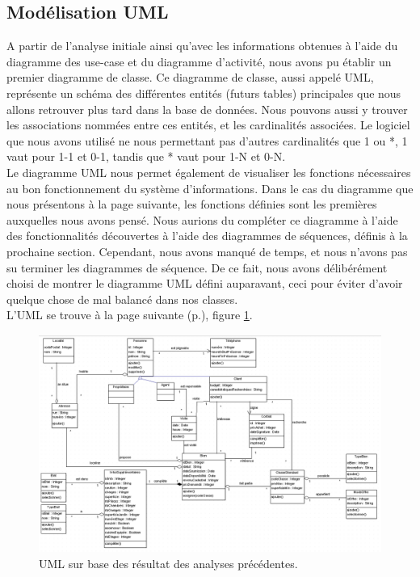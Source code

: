 \mbox{}
\subsection{Modélisation UML}
A partir de l'analyse initiale ainsi qu'avec les informations obtenues à l'aide du diagramme des use-case et du diagramme d'activité, nous avons pu établir un premier diagramme de classe. Ce diagramme de classe, aussi appelé UML, représente un schéma des différentes entités (futurs tables) principales que nous allons retrouver plus tard dans la base de données. Nous pouvons aussi y trouver les associations nommées entre ces entités, et les cardinalités associées. Le logiciel que nous avons utilisé ne nous permettant pas d'autres cardinalités que 1 ou *, 1 vaut pour 1-1 et 0-1, tandis que * vaut pour 1-N et 0-N.\\

Le diagramme UML nous permet également de visualiser les fonctions nécessaires au bon fonctionnement du système d'informations. Dans le cas du diagramme que nous présentons à la page suivante, les fonctions définies sont les premières auxquelles nous avons pensé. Nous aurions du compléter ce diagramme à l'aide des fonctionnalités découvertes à l'aide des diagrammes de séquences, définis à la prochaine section. Cependant, nous avons manqué de temps, et nous n'avons pas su terminer les diagrammes de séquence. De ce fait, nous avons délibérément choisi de montrer le diagramme UML défini auparavant, ceci pour éviter d'avoir quelque chose de mal balancé dans nos classes.\\

 L'UML se trouve à la page suivante (p.\pageref{fig:uml}), figure \ref{fig:uml}.


\newpage
\begin{landscape}
\begin{figure}[H]
\centering
\includegraphics[width=23cm]{uml.png}
\caption{UML sur base des résultat des analyses précédentes.}
\label{fig:uml}
\end{figure}
\end{landscape}